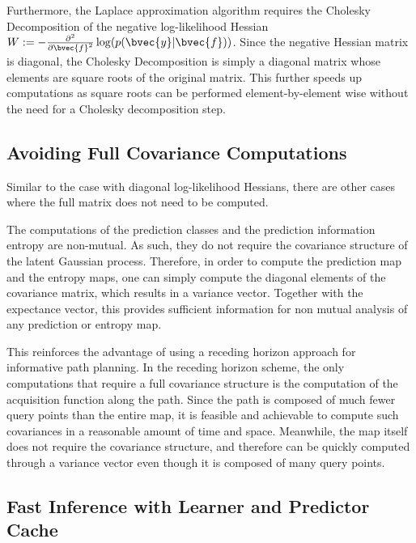 			Furthermore, the Laplace approximation algorithm requires the Cholesky Decomposition of the negative log-likelihood Hessian $W := -\frac{\partial^{2}}{{\partial \bvec{f}}^{2}} \log(p(\bvec{y} | \bvec{f}))$. Since the negative Hessian matrix is diagonal, the Cholesky Decomposition is simply a diagonal matrix whose elements are square roots of the original matrix. This further speeds up computations as square roots can be performed element-by-element wise without the need for a Cholesky decomposition step.
			
		\subsection{Avoiding Full Covariance Computations}
		\label{Appendix:ComputationalAspects:TimeSpaceComplexity:CovarianceAvoidance}
		
			Similar to the case with diagonal log-likelihood Hessians, there are other cases where the full matrix does not need to be computed. 
			
			The computations of the prediction classes and the prediction information entropy are non-mutual. As such, they do not require the covariance structure of the latent Gaussian process. Therefore, in order to compute the prediction map and the entropy maps, one can simply compute the diagonal elements of the covariance matrix, which results in a variance vector. Together with the expectance vector, this provides sufficient information for non mutual analysis of any prediction or entropy map.
			
			This reinforces the advantage of using a receding horizon approach for informative path planning. In the receding horizon scheme, the only computations that require a full covariance structure is the computation of the acquisition function along the path. Since the path is composed of much fewer query points than the entire map, it is feasible and achievable to compute such covariances in a reasonable amount of time and space. Meanwhile, the map itself does not require the covariance structure, and therefore can be quickly computed through a variance vector even though it is composed of many query points.
	
		\subsection{Fast Inference with Learner and Predictor Cache}
		\label{Appendix:ComputationalAspects:TimeSpaceComplexity:Cache}
		
